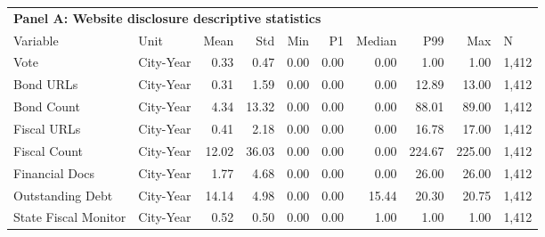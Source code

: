 \begin{table}[H]
\centering
\begin{tabular*}{\textwidth}{@{\extracolsep{\fill}}llrrrrrrrl}
\multicolumn{10}{l}{\textbf{Panel A: Website disclosure descriptive statistics}}\\

\addlinespace
  \toprule
Variable & Unit & Mean & Std & Min & P1 & Median & P99 & Max & N \\ 
  \hline
Vote & City-Year & 0.33 & 0.47 & 0.00 & 0.00 & 0.00 & 1.00 & 1.00 & 1,412 \\ 
  Bond URLs & City-Year & 0.31 & 1.59 & 0.00 & 0.00 & 0.00 & 12.89 & 13.00 & 1,412 \\ 
  Bond Count & City-Year & 4.34 & 13.32 & 0.00 & 0.00 & 0.00 & 88.01 & 89.00 & 1,412 \\ 
  Fiscal URLs & City-Year & 0.41 & 2.18 & 0.00 & 0.00 & 0.00 & 16.78 & 17.00 & 1,412 \\ 
  Fiscal Count & City-Year & 12.02 & 36.03 & 0.00 & 0.00 & 0.00 & 224.67 & 225.00 & 1,412 \\ 
  Financial Docs & City-Year & 1.77 & 4.68 & 0.00 & 0.00 & 0.00 & 26.00 & 26.00 & 1,412 \\ 
  Outstanding Debt & City-Year & 14.14 & 4.98 & 0.00 & 0.00 & 15.44 & 20.30 & 20.75 & 1,412 \\ 
  State Fiscal Monitor & City-Year & 0.52 & 0.50 & 0.00 & 0.00 & 1.00 & 1.00 & 1.00 & 1,412 \\ 
   \hline
\end{tabular*}
\end{table}
